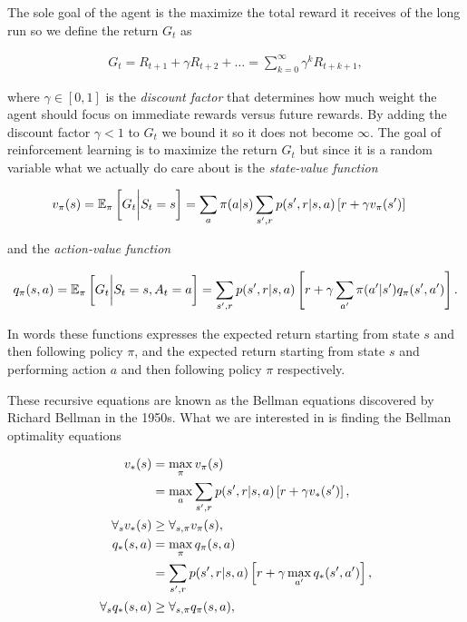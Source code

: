 \documentclass[result.tex]{subfiles}
\begin{document}
    The sole goal of the agent is the maximize the total reward it receives of the long run so we define the return $G_t$ as

    \begin{align*}
        G_t = R_{t + 1} + \gamma R_{t + 2} + \ldots = \sum_{k = 0}^{\infty} \gamma^k R_{t + k + 1},
    \end{align*}

    where $\gamma \in \left[0, 1 \right]$ is the \textit{discount factor} that determines how much weight the agent should focus on immediate rewards versus future rewards. By adding the discount factor $\gamma < 1$ to $G_t$ we bound it so it does not become $\infty$. The goal of reinforcement learning is to maximize the return $G_t$ but since it is a random variable what we actually do care about is the \textit{state-value function}

    \begin{align*}
        v_{\pi}(s) &= \mathbb{E}_\pi \left[ G_t \bigg\rvert S_t = s \right]
        = \sum_a \pi(a | s) \sum_{s^\prime, r} p(s^\prime, r | s, a) \left[ r + \gamma v_\pi(s^\prime) \right]
    \end{align*}

    and the \textit{action-value function}

    \begin{align*}
        q_{\pi}(s, a) = \mathbb{E}_\pi \left[ G_t \bigg\rvert S_t = s, A_t = a \right]
        = \sum_{s^\prime, r} p(s^\prime, r | s, a) \left[ r + \gamma \sum_{a^\prime} \pi(a^\prime | s^\prime) q_\pi(s^\prime, a^\prime) \right].
    \end{align*}

    In words these functions expresses the expected return starting from state $s$ and then following policy $\pi$, and the expected return starting from state $s$ and performing action $a$ and then following policy $\pi$ respectively.

    These recursive equations are known as the Bellman equations discovered by Richard Bellman in the 1950s. What we are interested in is finding the Bellman optimality equations

    \begin{align*}
        v_{\ast}(s)
        &= \max_{\pi} v_{\pi}(s) \\
        &= \max_a \sum_{s^\prime, r} p(s^\prime, r | s, a) \left[ r + \gamma v_\ast(s^\prime) \right], \\
        \forall_s v_{\ast}(s) &\geq \forall_{s, \pi} v_{\pi}(s), \\
        q_{\ast}(s, a)
        &= \max_{\pi} q_{\pi}(s, a) \\
        &= \sum_{s^\prime, r} p(s^\prime, r | s, a) \left[ r + \gamma \max_{a^\prime} q_\ast(s^\prime, a^\prime) \right], \\
        \forall_s q_{\ast}(s, a) &\geq \forall_{s, \pi} q_{\pi}(s, a),
    \end{align*}
\end{document}
